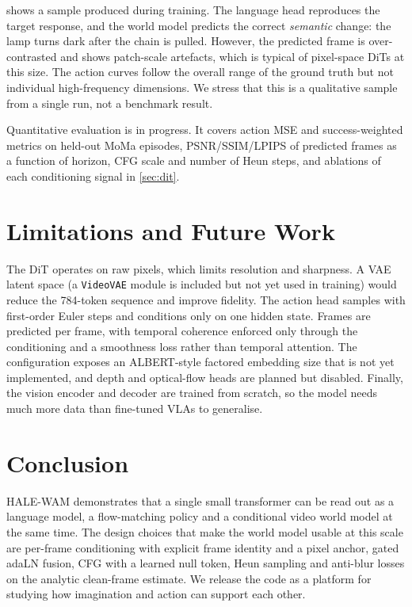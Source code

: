 \documentclass[11pt]{article}
\begin{document}
 shows a sample produced during training. The language head reproduces the
target response, and the world model predicts the correct \emph{semantic} change: the lamp
turns dark after the chain is pulled. However, the predicted frame is over-contrasted and
shows patch-scale artefacts, which is typical of pixel-space DiTs at this size. The action
curves follow the overall range of the ground truth but not individual high-frequency
dimensions. We stress that this is a qualitative sample from a single run, not a benchmark
result.

Quantitative evaluation is in progress. It covers action MSE and success-weighted metrics on
held-out MoMa episodes, PSNR/SSIM/LPIPS of predicted frames as a function of horizon, CFG
scale and number of Heun steps, and ablations of each conditioning signal in \cref{sec:dit}.

\section{Limitations and Future Work}

The DiT operates on raw pixels, which limits resolution and sharpness. A VAE latent space
(a \texttt{VideoVAE} module is included but not yet used in training) would reduce the
784-token sequence and improve fidelity. The action head samples with first-order Euler
steps and conditions only on one hidden state. Frames are predicted per frame, with
temporal coherence enforced only through the conditioning and a smoothness loss rather
than temporal attention. The configuration exposes an ALBERT-style factored embedding size
that is not yet implemented, and depth and optical-flow heads are planned but disabled.
Finally, the vision encoder and decoder are trained from scratch, so the model needs much
more data than fine-tuned VLAs to generalise.

\section{Conclusion}

HALE-WAM demonstrates that a single small transformer can be read out as a language model,
a flow-matching policy and a conditional video world model at the same time. The design
choices that make the world model usable at this scale are per-frame conditioning with
explicit frame identity and a pixel anchor, gated adaLN fusion, CFG with a learned null
token, Heun sampling and anti-blur losses on the analytic clean-frame estimate. We release
the code as a platform for studying how imagination and action can support each other.



\end{document}
